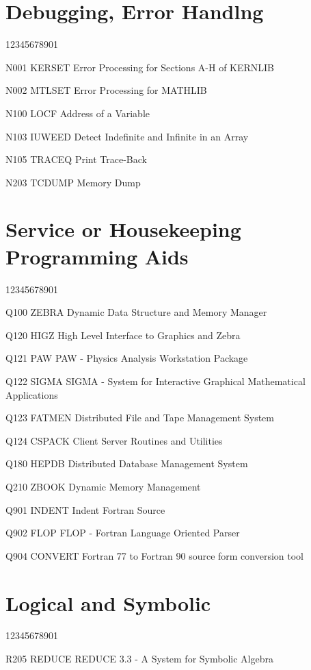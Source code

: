 \section*{Debugging, Error Handlng}
\begin{DLtt}{12345678901}
\item[N001 KERSET] Error Processing for Sections A-H of KERNLIB
\item[N002 MTLSET] Error Processing for MATHLIB
\item[N100 LOCF] Address of a Variable
\item[N103 IUWEED] Detect Indefinite and Infinite in an Array
\item[N105 TRACEQ] Print Trace-Back
\item[N203 TCDUMP] Memory Dump
\end{DLtt}
\section*{Service or Housekeeping Programming Aids}
\begin{DLtt}{12345678901}
\item[Q100 ZEBRA] Dynamic Data Structure and Memory Manager
\item[Q120 HIGZ] High Level Interface to Graphics and Zebra
\item[Q121 PAW] PAW - Physics Analysis Workstation Package
\item[Q122 SIGMA] SIGMA - System for Interactive Graphical Mathematical Applications
\item[Q123 FATMEN] Distributed File and Tape Management System
\item[Q124 CSPACK] Client Server Routines and Utilities
\item[Q180 HEPDB] Distributed Database Management System
\item[Q210 ZBOOK] Dynamic Memory Management
\item[Q901 INDENT] Indent Fortran Source
\item[Q902 FLOP] FLOP - Fortran Language Oriented Parser
\item[Q904 CONVERT] Fortran 77 to Fortran 90 source form conversion tool
\end{DLtt}
\section*{Logical and Symbolic}
\begin{DLtt}{12345678901}
\item[R205 REDUCE] REDUCE 3.3 - A System for Symbolic Algebra
\end{DLtt}
